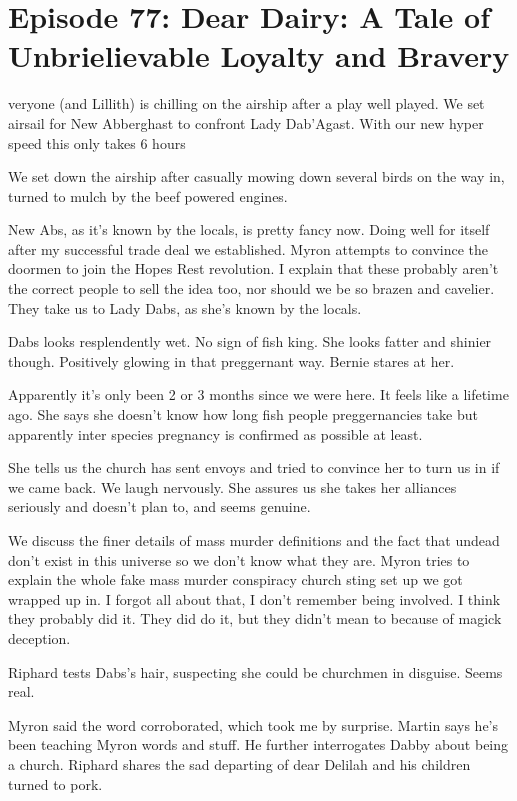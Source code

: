 \section{Episode 77: Dear Dairy: A Tale of Unbrielievable Loyalty and Bravery}

\medskip

veryone (and Lillith) is chilling on the airship after a play well played. We set airsail for New Abberghast to confront Lady Dab’Agast. With our new hyper speed this only takes 6 hours\medskip

We set down the airship after casually mowing down several birds on the way in, turned to mulch by the beef powered engines.\medskip

New Abs, as it’s known by the locals, is pretty fancy now. Doing well for itself after my successful trade deal we established. Myron attempts to convince the doormen to join the Hopes Rest revolution. I explain that these probably aren’t the correct people to sell the idea too, nor should we be so brazen and cavelier. They take us to Lady Dabs, as she’s known by the locals.\medskip

Dabs looks resplendently wet. No sign of fish king. She looks fatter and shinier though. Positively glowing in that preggernant way. Bernie stares at her.\medskip

Apparently it’s only been 2 or 3 months since we were here. It feels like a lifetime ago. She says she doesn’t know how long fish people preggernancies take but apparently inter species pregnancy is confirmed as possible at least.\medskip

She tells us the church has sent envoys and tried to convince her to turn us in if we came back. We laugh nervously. She assures us she takes her alliances seriously and doesn’t plan to, and seems genuine.\medskip

We discuss the finer details of mass murder definitions and the fact that undead don’t exist in this universe so we don’t know what they are. Myron tries to explain the whole fake mass murder conspiracy church sting set up we got wrapped up in. I forgot all about that, I don’t remember being involved. I think they probably did it. They did do it, but they didn’t mean to because of magick deception.\medskip

Riphard tests Dabs’s hair, suspecting she could be churchmen in disguise. Seems real.\medskip

Myron said the word corroborated, which took me by surprise. Martin says he’s been teaching Myron words and stuff. He further interrogates Dabby about being a church. Riphard shares the sad departing of dear Delilah and his children turned to pork.\medskip

